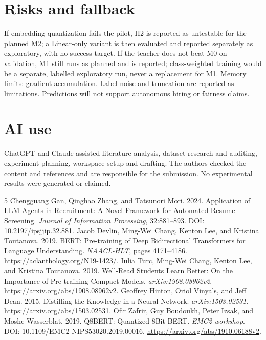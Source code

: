 \documentclass[11pt]{article}
\begin{document}
\section{Risks and fallback}
If embedding quantization fails the pilot, H2 is reported as untestable for the planned M2; a Linear-only variant is then evaluated and reported separately as exploratory, with no success target. If the teacher does not beat M0 on validation, M1 still runs as planned and is reported; class-weighted training would be a separate, labelled exploratory run, never a replacement for M1. Memory limits: gradient accumulation. Label noise and truncation are reported as limitations. Predictions will not support autonomous hiring or fairness claims.

\section{AI use}
ChatGPT and Claude assisted literature analysis, dataset research and auditing, experiment planning, workspace setup and drafting. The authors checked the content and references and are responsible for the submission. No experimental results were generated or claimed.

\begin{thebibliography}{5}
 Chengguang Gan, Qinghao Zhang, and Tatsunori Mori. 2024. Application of LLM Agents in Recruitment: A Novel Framework for Automated Resume Screening. \emph{Journal of Information Processing}, 32:881--893. DOI: 10.2197/ipsjjip.32.881.
 Jacob Devlin, Ming-Wei Chang, Kenton Lee, and Kristina Toutanova. 2019. BERT: Pre-training of Deep Bidirectional Transformers for Language Understanding. \emph{NAACL-HLT}, pages 4171--4186. \url{https://aclanthology.org/N19-1423/}.
 Iulia Turc, Ming-Wei Chang, Kenton Lee, and Kristina Toutanova. 2019. Well-Read Students Learn Better: On the Importance of Pre-training Compact Models. \emph{arXiv:1908.08962v2}. \url{https://arxiv.org/abs/1908.08962v2}.
 Geoffrey Hinton, Oriol Vinyals, and Jeff Dean. 2015. Distilling the Knowledge in a Neural Network. \emph{arXiv:1503.02531}. \url{https://arxiv.org/abs/1503.02531}.
 Ofir Zafrir, Guy Boudoukh, Peter Izsak, and Moshe Wasserblat. 2019. Q8BERT: Quantized 8Bit BERT. \emph{EMC2 workshop}. DOI: 10.1109/EMC2-NIPS53020.2019.00016. \url{https://arxiv.org/abs/1910.06188v2}.
\end{thebibliography}
\end{document}
